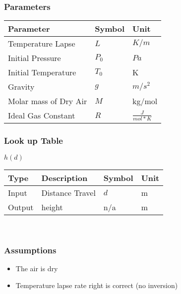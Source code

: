 \documentclass[../SimBALink.tex]{subfiles}
\begin{document}
\subsubsection{Parameters}
	\begin{tabular}{ l | l | l  }
		Parameter					&	Symbol		&	Unit		\\	\hline
		Temperature Lapse		&	$L$			&	 $K/m$ \\
		Initial Pressure 		&  $P_0$		&	$Pa$ \\
		Initial Temperature		&  $T_0$		&	K \\
		Gravity 				&  $g$			&  $m/s^2$ \\
		Molar mass of Dry Air	& $M$			&  kg/mol \\
		Ideal Gas Constant 		& $R$			& $\frac{J}{mol * K}$
	\end{tabular}
	
	\subsubsection{Look up Table}
	$h(d)$ \\
	\begin{tabular}{ l | l | l | l }
		Type				& Description		&	Symbol		&	Unit		\\	\hline
		Input 				& Distance Travel	&	$d$  		& m		\\
		Output 				& height 			&	n/a			&  m
	\end{tabular} \\
\subsubsection{Assumptions}
\begin{itemize}
  \item The air is dry 
  \item Temperature lapse rate right is correct (no inversion)
\end{itemize}
\end{document}
